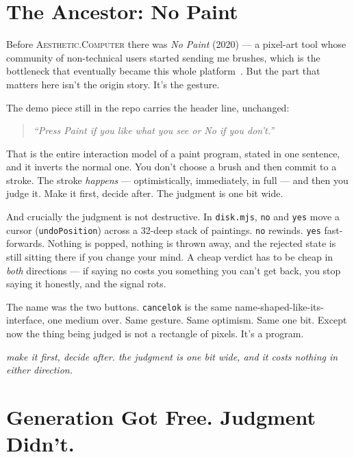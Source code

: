 \documentclass[10pt,letterpaper,twocolumn]{article}
\newcommand{\ac}{\textsc{Aesthetic.Computer}}
\newcommand{\pull}[1]{%
  \par\vspace{0.4em}
  {\aclight\small\color{acpink}\itshape #1}\par
  \vspace{0.4em}}
\begin{document}

\section{The Ancestor: No Paint}

Before \ac{} there was \emph{No Paint} (2020) --- a pixel-art tool whose community of non-technical users started sending me brushes, which is the bottleneck that eventually became this whole platform~\citep{scudder2026ac}. But the part that matters here isn't the origin story. It's the gesture.

The demo piece still in the repo carries the header line, unchanged:

\begin{quote}
\small\emph{``Press Paint if you like what you see or No if you don't.''}
\end{quote}

That is the entire interaction model of a paint program, stated in one sentence, and it inverts the normal one. You don't choose a brush and then commit to a stroke. The stroke \emph{happens} --- optimistically, immediately, in full --- and then you judge it. Make it first, decide after. The judgment is one bit wide.

And crucially the judgment is not destructive. In \texttt{disk.mjs}, \texttt{no} and \texttt{yes} move a cursor (\texttt{undoPosition}) across a 32-deep stack of paintings. \texttt{no} rewinds. \texttt{yes} fast-forwards. Nothing is popped, nothing is thrown away, and the rejected state is still sitting there if you change your mind. A cheap verdict has to be cheap in \emph{both} directions --- if saying no costs you something you can't get back, you stop saying it honestly, and the signal rots.

The name was the two buttons. \texttt{cancelok} is the same name-shaped-like-its-interface, one medium over. Same gesture. Same optimism. Same one bit. Except now the thing being judged is not a rectangle of pixels. It's a program.

\pull{make it first, decide after. the judgment is one bit wide, and it costs nothing in either direction.}


\section{Generation Got Free. Judgment Didn't.}
\end{document}
